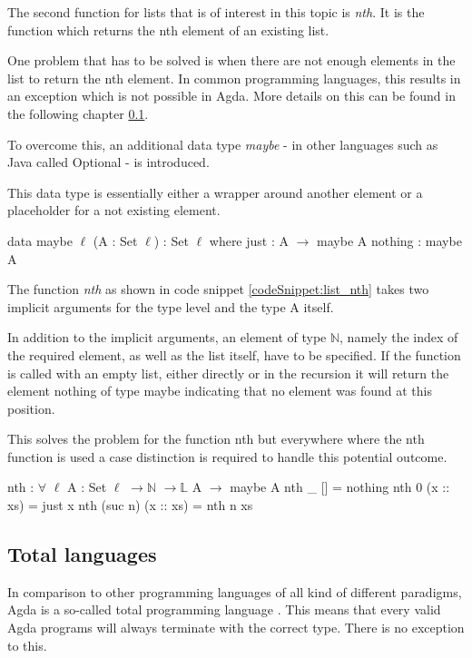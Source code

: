 The second function for lists that is of interest in this topic is \emph{nth}.
It is the function which returns the nth element of an existing list.

One problem that has to be solved is when there are not enough elements in the list to return the nth element. 
In common programming languages, this results in an exception which is not possible in Agda.
More details on this can be found in the following chapter \ref{section:total_languages}.

To overcome this, an additional data type \emph{maybe} - in other languages such as Java called Optional - is introduced.

This data type is essentially either a wrapper around another element or a placeholder for a not existing element.

\begin{codesnippet}[mathescape=true, caption={Definition of the maybe datatype in Agda}, label={codeSnippet:maybe_datatype}]
data maybe {$\ell$} (A : Set $\ell$) : Set $\ell$ where
  just : A $\rightarrow$ maybe A
  nothing : maybe A
\end{codesnippet}

The function \emph{nth} as shown in code snippet \ref{codeSnippet:list_nth} takes two implicit arguments for the type level and the type A itself.

In addition to the implicit arguments, an element of type $\mathbb{N}$, namely the index of the required element, as well as the list itself, have to be specified.
If the function is called with an empty list, either directly or in the recursion it will return the element nothing of type maybe indicating that no element was found at this position.

This solves the problem for the function nth but everywhere where the nth function is used a case distinction is required to handle this potential outcome.
\begin{codesnippet}[mathescape=true, caption={Definition of nth function in Agda}, label={codeSnippet:list_nth}]
nth : $\forall$ {$\ell$} {A : Set $\ell$} $\rightarrow \mathbb{N}$ $\rightarrow \mathbb{L}$ A $\rightarrow$ maybe A
nth _ [] = nothing
nth 0 (x :: xs) = just x
nth (suc n) (x :: xs) = nth n xs
\end{codesnippet}

\subsection{Total languages}\label{section:total_languages}
In comparison to other programming languages of all kind of different paradigms, Agda is a so-called total programming language \cite{AgdaReadTheDocs}.
This means that every valid Agda programs will always terminate with the correct type. There is no exception to this.

